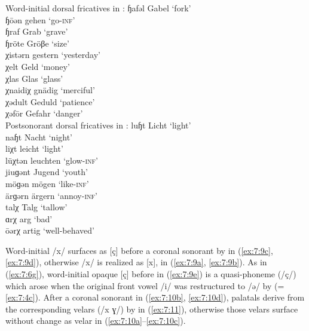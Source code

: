 \ea%
\label{ex:7:9}Word-initial dorsal fricatives in :
\ea\label{ex:7:9a} ɧafəl \tab [xɑfəl] \tab Gabel \tab ‘fork’ \\
    ɧōən \tab [xoːən] \tab gehen \tab ‘go\textsc{{}-inf}’ \\
\ex\label{ex:7:9b} ɧraf \tab [xʀɑf] \tab Grab \tab ‘grave’ \\
     ɧröte \tab [xʀøtə] \tab Gröβe \tab ‘size’ \\
\ex\label{ex:7:9c} χistərn \tab [çistəʀn] \tab gestern \tab ‘yesterday’ \\
    χelt \tab [çelt] \tab Geld \tab ‘money’ \\
\ex\label{ex:7:9d} χlas \tab [çlɑs] \tab Glas \tab ‘glass’ \\
     χnaidiχ \tab [çnɑidiç] \tab gnädig \tab ‘merciful’ \\
\ex\label{ex:7:9e} χədult \tab [çədult] \tab Geduld \tab ‘patience’ \\
   χəfōr \tab [çəfoːʀ] \tab Gefahr \tab ‘danger’ \\
\z
\ex%
\label{ex:7:10}Postsonorant dorsal fricatives in :
\ea\label{ex:7:10a}  luɧt     \tab [luxt] \tab Licht \tab ‘light’ \\
     naɧt     \tab [nɑxt] \tab Nacht \tab ‘night’ \\
\ex\label{ex:7:10b}  liχt     \tab [liçt] \tab leicht \tab ‘light’ \\
     lüχtǝn   \tab [lyçtǝn] \tab leuchten \tab ‘glow\textsc{{}-inf}’ \\
\ex\label{ex:7:10c}  jiuɡǝnt  \tab [ʝiuɣǝnt] \tab Jugend \tab ‘youth’ \\
     möɡǝn    \tab [møɣǝn] \tab mögen \tab ‘like-\textsc{inf}’ \\
     ärɡǝrn   \tab [ɛʀɣǝrn] \tab ärgern \tab ‘annoy-\textsc{inf}’ \\
\ex\label{ex:7:10d}  talχ     \tab [tɑlç] \tab Talg \tab ‘tallow’ \\
\ex\label{ex:7:10e}  ɑrχ      \tab [ɑʀç] \tab arg \tab ‘bad’ \\
     ōərχ     \tab [oːəʀç] \tab artig \tab ‘well-behaved’ 
\z
\z 

Word-initial /x/ surfaces as [ç] before a coronal sonorant by  in (\ref{ex:7:9c}, \ref{ex:7:9d}), otherwise /x/ is realized as [x], in (\ref{ex:7:9a}, \ref{ex:7:9b}). As in  (\ref{ex:7:6g}), word-initial opaque [ç] before  in (\ref{ex:7:9e}) is a quasi-phoneme (/ç/) which arose when the original front vowel /i/ was restructured to /ə/ by  (=\ref{ex:7:4c}). After a coronal sonorant in (\ref{ex:7:10b}, \ref{ex:7:10d}), palatals derive from the corresponding velars (/x ɣ/) by  in (\ref{ex:7:11}), otherwise those velars surface without change as velar in (\ref{ex:7:10a}--\ref{ex:7:10c}).

